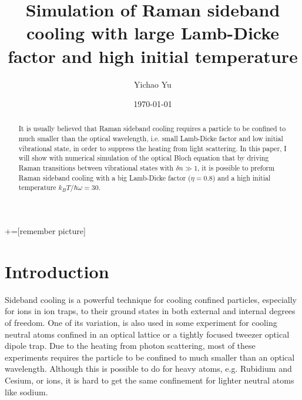 \documentclass[aps,twocolumn,secnumarabic,balancelastpage,amsmath,amssymb,nofootinbib]{revtex4}
\begin{document}
+=[remember picture]
\title{Simulation of Raman sideband cooling with large Lamb-Dicke factor and high initial temperature}
\author{Yichao Yu}
\date{\today}

\begin{abstract}
  It is usually believed that Raman sideband cooling requires a particle to be confined to much smaller than the optical wavelength, i.e. small Lamb-Dicke factor and low initial vibrational state, in order to suppress the heating from light scattering. In this paper, I will show with numerical simulation of the optical Bloch equation that by driving Raman transitions between vibrational states with $\delta n\gg1$, it is possible to preform Raman sideband cooling with a big Lamb-Dicke factor ($\eta=0.8$) and a high initial temperature $k_BT/\hbar\omega=30$.
\end{abstract}

\maketitle
\section*{Introduction}
Sideband cooling is a powerful technique for cooling confined particles, especially for ions in ion traps, to their ground states in both external and internal degrees of freedom. One of its variation, is also used in some experiment for cooling neutral atoms confined in an optical lattice\cite{sideband-cs-lattice} or a tightly focused tweezer optical dipole trap\cite{sideband-single-jila,sideband-single-cua}. Due to the heating from photon scattering, most of these experiments requires the particle to be confined to much smaller than an optical wavelength. Although this is possible to do for heavy atoms, e.g. Rubidium and Cesium, or ions, it is hard to get the same confinement for lighter neutral atoms like sodium.
\end{document}
